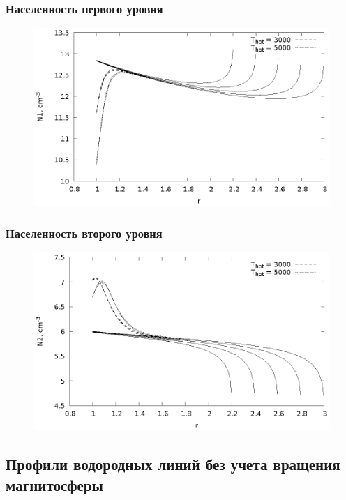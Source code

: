 \documentclass{beamer}
\begin{document}
\begin{frame}
\frametitle{Населенность первого уровня}
\begin{figure}[!h]
\centering
\includegraphics[width=\textwidth]{N1.eps}
\end{figure}
\end{frame}


\begin{frame}
\frametitle{Населенность второго уровня}
\begin{figure}[!h]
\centering
\includegraphics[width=\textwidth]{N2.eps}
\end{figure}
\end{frame}


\subsection[Профили линий]{Профили водородных линий без учета вращения магнитосферы}
\end{document}
